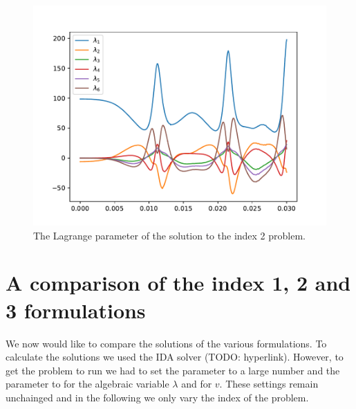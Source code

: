 \documentclass{report}
\begin{document}
\begin{figure}[h]
\centering
\begin{minipage}[b]{0.45\textwidth}
\centering
\includegraphics[width=\textwidth]{../Plots/Project2_main/Figure_512}
\caption{The Lagrange parameter of the solution to the index 2 problem.}
\label{pl:indx2_soln_lambdas}
\end{minipage}
\end{figure}

\section*{A comparison of the index 1, 2 and 3 formulations}

We now would like to compare the solutions of the various formulations. To calculate the solutions we used the IDA solver (TODO: hyperlink). However, to get the problem to run we had to set the  parameter to a large number and the  parameter to  for the algebraic variable $\lambda$ and for $v$. These settings remain unchainged and in the following we only vary the index of the problem.
\end{document}
